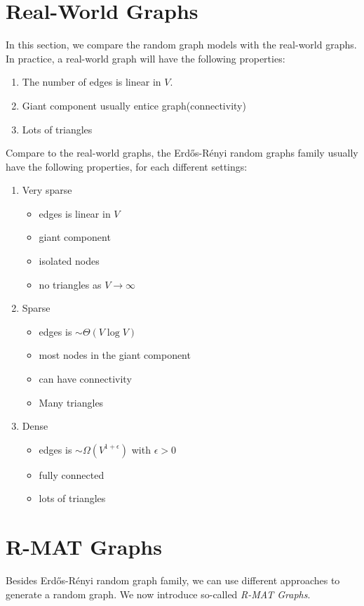 \section{Real-World Graphs}
In this section, we compare the random graph models with the real-world graphs. In practice, a real-world graph will have the following
properties:
\begin{enumerate}
	\item The number of edges is linear in \(V\).
	\item Giant component usually entice graph(connectivity)
	\item Lots of triangles
\end{enumerate}

Compare to the real-world graphs, the Erdős-Rényi random graphs family usually have the following properties, for each different settings:
\begin{enumerate}
	\item Very sparse
	      \begin{itemize}
		      \item edges is linear in \(V\)
		      \item giant component
		      \item isolated nodes
		      \item no triangles as \(V\to \infty \)
	      \end{itemize}
	\item Sparse
	      \begin{itemize}
		      \item edges is \(\sim \Theta(V\log V)\)
		      \item most nodes in the giant component
		      \item can have connectivity
		      \item Many triangles
	      \end{itemize}
	\item Dense
	      \begin{itemize}
		      \item edges is \(\sim \Omega(V^{1+\epsilon})\) with \(\epsilon>0\)
		      \item fully connected
		      \item lots of triangles
	      \end{itemize}
\end{enumerate}

\section{R-MAT Graphs}
Besides Erdős-Rényi random graph family, we can use different approaches to generate a random graph. We now introduce so-called \emph{R-MAT Graphs}.
